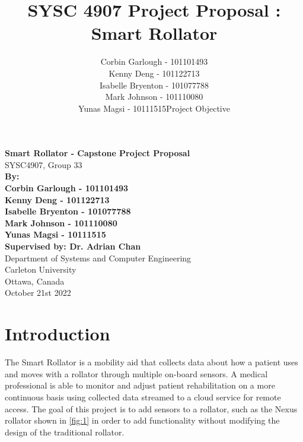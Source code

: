 \documentclass{article}
\title{SYSC 4907 Project Proposal : Smart Rollator}
\date{}
\author {Corbin Garlough - 101101493 \\
Kenny Deng - 101122713 \\
Isabelle Bryenton - 101077788 \\
Mark Johnson - 101110080 \\
Yunas Magsi - 10111515Project Objective}
\begin{document}
\begin{titlepage}
   \begin{center}
       \vspace*{1cm}
       \large
       \textbf{Smart Rollator - Capstone Project Proposal} \\
       \vspace{0.5cm}
       \normalsize
        SYSC4907, Group 33
       \vspace{4cm} \\
       \textbf{By: \\
            Corbin Garlough - 101101493 \\
            Kenny Deng - 101122713 \\
            Isabelle Bryenton - 101077788 \\
            Mark Johnson - 101110080 \\
            Yunas Magsi - 10111515} \\
       \vspace{2cm}
       \textbf{Supervised by: Dr. Adrian Chan \\}
       \vspace{4cm}
       Department of Systems and Computer Engineering\\
       Carleton University\\
       Ottawa, Canada\\
       October 21st 2022
   \end{center}
\end{titlepage}

\tableofcontents
\listoffigures
\listoftables
\newpage
\maketitle
\section{Introduction}
The Smart Rollator is a mobility aid that collects data about how a patient uses and moves with a rollator through multiple on-board sensors. A medical professional is able to monitor and adjust patient rehabilitation on a more continuous basis using collected data streamed to a cloud service for remote access. The goal of this project is to add sensors to a rollator, such as the Nexus rollator shown in \autoref{fig:1} in order to add functionality without modifying the design of the traditional rollator.
\end{document}
